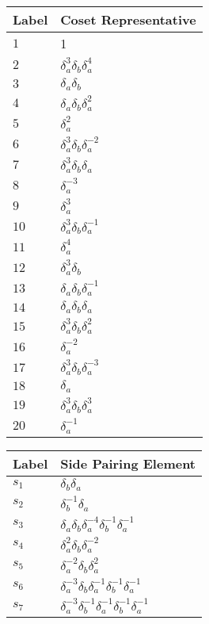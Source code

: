 \documentclass{article}
\begin{document}
\begin{center}
\begin{tabular}{ll}
\toprule
Label & Coset Representative\\
\midrule
$1$ & 1 \\
$2$ & $\delta_a^{3}\delta_b^{}\delta_a^{4}$ \\
$3$ & $\delta_a^{}\delta_b^{}$ \\
$4$ & $\delta_a^{}\delta_b^{}\delta_a^{2}$ \\
$5$ & $\delta_a^{2}$ \\
$6$ & $\delta_a^{3}\delta_b^{}\delta_a^{-2}$ \\
$7$ & $\delta_a^{3}\delta_b^{}\delta_a^{}$ \\
$8$ & $\delta_a^{-3}$ \\
$9$ & $\delta_a^{3}$ \\
$10$ & $\delta_a^{3}\delta_b^{}\delta_a^{-1}$ \\
$11$ & $\delta_a^{4}$ \\
$12$ & $\delta_a^{3}\delta_b^{}$ \\
$13$ & $\delta_a^{}\delta_b^{}\delta_a^{-1}$ \\
$14$ & $\delta_a^{}\delta_b^{}\delta_a^{}$ \\
$15$ & $\delta_a^{3}\delta_b^{}\delta_a^{2}$ \\
$16$ & $\delta_a^{-2}$ \\
$17$ & $\delta_a^{3}\delta_b^{}\delta_a^{-3}$ \\
$18$ & $\delta_a^{}$ \\
$19$ & $\delta_a^{3}\delta_b^{}\delta_a^{3}$ \\
$20$ & $\delta_a^{-1}$ \\
\bottomrule
\end{tabular}
\hfill
\begin{tabular}{ll}
\toprule
Label & Side Pairing Element\\
\midrule
$s_{1}$ & $\delta_b^{}\delta_a^{}$ \\
$s_{2}$ & $\delta_b^{-1}\delta_a^{}$ \\
$s_{3}$ & $\delta_a^{}\delta_b^{}\delta_a^{-4}\delta_b^{-1}\delta_a^{-1}$ \\
$s_{4}$ & $\delta_a^{2}\delta_b^{}\delta_a^{-2}$ \\
$s_{5}$ & $\delta_a^{-2}\delta_b^{}\delta_a^{2}$ \\
$s_{6}$ & $\delta_a^{-3}\delta_b^{}\delta_a^{-1}\delta_b^{-1}\delta_a^{-1}$ \\
$s_{7}$ & $\delta_a^{-3}\delta_b^{-1}\delta_a^{-1}\delta_b^{-1}\delta_a^{-1}$ \\

\end{tabular}
\end{center}
\end{document}
